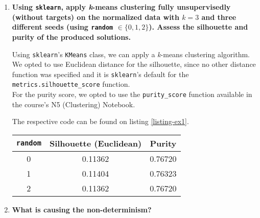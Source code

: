 \documentclass[12pt]{article}
\begin{document}
\begin{enumerate}[leftmargin=\labelsep]
    \item {\color{questioncolor}\bfseries
          Using \texttt{sklearn}, apply \textit{k}-means clustering fully unsupervisedly
          (without targets) on the normalized data with $k = 3$ and three different
          seeds (using \texttt{random} $\in \{0,1,2\}$).
          Assess the silhouette and purity of the produced solutions.
          }\\
          \vspace{0.5em}

          Using \texttt{sklearn}'s \texttt{KMeans} class, we can apply a
          \textit{k}-means clustering algorithm.\\
          We opted to use Euclidean distance for the silhouette, since no other distance
          function was specified and it is \texttt{sklearn}'s default for the
          \texttt{metrics.silhouette\_score} function.\\
          For the purity score, we opted to use the \texttt{purity\_score} function
          available in the course's N5 (Clustering) Notebook.

          The respective code can be found on listing \ref{listing-ex1}.

          \begin{center}
              \captionsetup{type=table}
              \begin{tabular}{c|cc}
                  \texttt{random}        & Silhouette (Euclidean) & Purity  \\
                  \hline
                  \textcolor{cred}{0}    & 0.11362                & 0.76720 \\
                  \textcolor{cblue}{1}   & 0.11404                & 0.76323 \\
                  \textcolor{corange}{2} & 0.11362                & 0.76720
              \end{tabular}
              \label{ex1p-silhouette-purity}
          \end{center}

    \item {\color{questioncolor}\bfseries
          What is causing the non-determinism?
          }\\
          \vspace{0.5em}


\end{enumerate}
\end{document}
